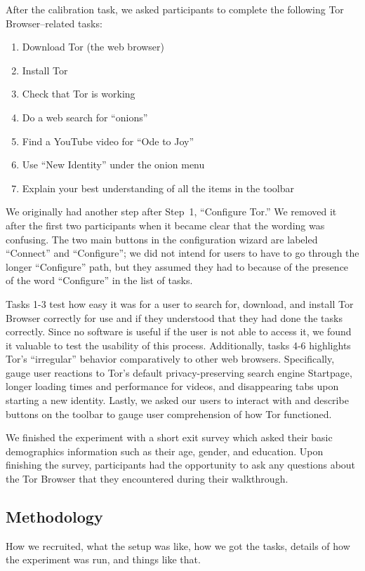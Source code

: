 \documentclass[letterpaper,twocolumn,11pt]{article}
\begin{document}
After the calibration task, we asked participants to complete
the following Tor Browser--related tasks: 

\begin{enumerate} \itemsep1pt \parskip0pt 
\item Download Tor (the web browser)
\item Install Tor
\item Check that Tor is working
\item Do a web search for ``onions''
\item Find a YouTube video for ``Ode to Joy''
\item Use ``New Identity'' under the onion menu
\item Explain your best understanding of all the items in the toolbar
\end{enumerate}

We originally had another step after Step~1, ``Configure Tor.''
We removed it after the first two participants
when it became clear that the wording was confusing.
The two main buttons in the configuration wizard are labeled
``Connect'' and ``Configure''; we did not intend for users
to have to go through the longer ``Configure'' path,
but they assumed they had to because of the presence
of the word ``Configure'' in the list of tasks.

Tasks 1-3 test how easy it was for a user to search for, download, and install Tor Browser 
correctly for use and if they understood that they had done the tasks correctly. 
Since no software is useful if the user is not able to access it, we found it valuable
to test the usability of this process.  Additionally, tasks 4-6 highlights Tor's ``irregular'' behavior 
comparatively to other web browsers. Specifically, gauge user reactions to Tor's default
privacy-preserving search engine Startpage,  longer loading times and performance for videos, 
and disappearing tabs upon starting a new identity. Lastly, we asked our users to 
interact with and describe buttons on the toolbar to gauge user comprehension of how Tor functioned.

We finished the experiment with a short exit survey which asked their basic demographics information 
such as their age, gender, and education. Upon finishing the survey, participants had the opportunity to 
ask any questions about the Tor Browser that they encountered during their walkthrough. 

\subsection{Methodology}
{\color {red} How we recruited, what the setup was like, how we got the tasks, details of 
how the experiment was run, and things like that.}
\end{document}
